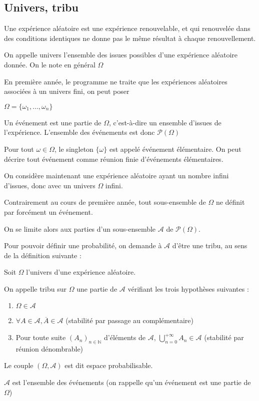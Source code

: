 \documentclass[a4paper,12pt]{book}
\newcommand{\Def}[2]{\begin{tcolorbox}[sharp corners, colback=white,colframe=blue!90!black!75, title=Définition : #1]#2\end{tcolorbox}}
\def\N{\mathbb{N}}
\begin{document}
\subsection{Univers, tribu}
\Def{}{Une expérience aléatoire est une expérience renouvelable, et qui renouvelée dans des conditions identiques ne donne pas le même résultat à chaque renouvellement.}
\Def{}{On appelle univers l'ensemble des issues possibles d'une expérience aléatoire donnée. On le note en général $\Omega$}
En première année, le programme ne traite que les expériences aléatoires associées à un univers fini, on peut poser \par\begin{center}$\Omega=\{\omega_1,...,\omega_n\}$\end{center}
\par Un événement est une partie de $\Omega$, c'est-à-dire un ensemble d'issues de l'expérience. L'ensemble des événements est donc $\mathcal{P}(\Omega)$
\par Pour tout $\omega\in\Omega$, le singleton $\{\omega\}$ est appelé événement élémentaire. On peut décrire tout événement comme réunion finie d'événements élémentaires.
\par On considère maintenant une expérience aléatoire ayant un nombre infini d'issues, donc avec un univers $\Omega$ infini.
\par Contrairement au cours de première année, tout sous-ensemble de $\Omega$ ne définit par forcément un événement.
\par On se limite alors aux parties d'un sous-ensemble $\mathcal{A}$ de $\mathcal{P}(\Omega)$.
\par Pour pouvoir définir une probabilité, on demande à $\mathcal{A}$ d'être une tribu, au sens de la définition suivante :
\Def{}{Soit $\Omega$ l'univers d'une expérience aléatoire.\par On appelle tribu sur $\Omega$ une partie de $\mathcal{A}$ vérifiant les trois hypothèses suivantes :\begin{enumerate}
\item $\Omega\in \mathcal{A}$
\item $\forall A\in \mathcal{A},\overline{A}\in \mathcal{A}$ (stabilité par passage au complémentaire)
\item Pour toute suite $(A_n)_{n\in\N}$ d'éléments de $\mathcal{A}$, $\bigcup_{n=0}^{+\infty}A_n\in\mathcal{A}$ (stabilité par réunion dénombrable)
\end{enumerate}
Le couple $(\Omega, \mathcal{A})$ est dit espace probabilisable.
\par $\mathcal{A}$ est l'ensemble des événements (on rappelle qu'un événement est une partie de $\Omega$)}
\end{document}
